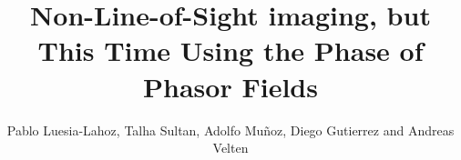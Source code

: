 \usepackage{amsmath,amsfonts}
\usepackage{url}
\usepackage{verbatim}
\usepackage{import}
\usepackage{svg}
\usepackage{multirow}
\usepackage{caption}
\usepackage{subcaption}

\usepackage{graphicx}    

\usepackage[english]{babel}
\usepackage{csquotes}

\title{Non-Line-of-Sight imaging, but This Time Using the Phase of Phasor Fields}
\author{Pablo Luesia-Lahoz, Talha Sultan, Adolfo Muñoz, Diego Gutierrez and Andreas Velten}



\maketitle







